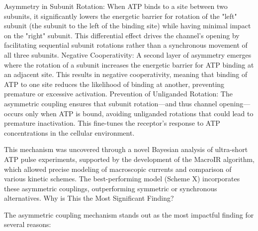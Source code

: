 \documentclass[a4paper,12pt]{article}
\begin{document}
		Asymmetry in Subunit Rotation: When ATP binds to a site between two subunits, it significantly lowers the energetic barrier for rotation of the "left" subunit (the subunit to the left of the binding site) while having minimal impact on the "right" subunit. This differential effect drives the channel's opening by facilitating sequential subunit rotations rather than a synchronous movement of all three subunits.
		Negative Cooperativity: A second layer of asymmetry emerges where the rotation of a subunit increases the energetic barrier for ATP binding at an adjacent site. This results in negative cooperativity, meaning that binding of ATP to one site reduces the likelihood of binding at another, preventing premature or excessive activation.
		Prevention of Unliganded Rotation: The asymmetric coupling ensures that subunit rotation—and thus channel opening—occurs only when ATP is bound, avoiding unliganded rotations that could lead to premature inactivation. This fine-tunes the receptor’s response to ATP concentrations in the cellular environment.
		
		This mechanism was uncovered through a novel Bayesian analysis of ultra-short ATP pulse experiments, supported by the development of the MacroIR algorithm, which allowed precise modeling of macroscopic currents and comparison of various kinetic schemes. The best-performing model (Scheme X) incorporates these asymmetric couplings, outperforming symmetric or synchronous alternatives.
		Why is This the Most Significant Finding?
		
		The asymmetric coupling mechanism stands out as the most impactful finding for several reasons:
		
\end{document}
